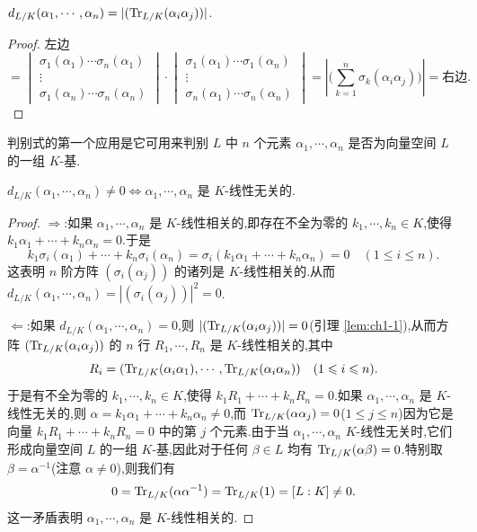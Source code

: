 \begin{lemma}\label{lem:ch1-1}
$d_{L/K}(\alpha_1,\cdots,\alpha_n)=|(\mathrm{Tr}_{L/K}(\alpha_i\alpha_j))|$.
\end{lemma}

\begin{proof}
左边
\[
  =\begin{vmatrix}
    \sigma_1(\alpha_1)\cdots\sigma_n(\alpha_1)\\
    \vdots\\
    \sigma_1(\alpha_n)\cdots\sigma_n(\alpha_n)
  \end{vmatrix}
  \cdot
  \begin{vmatrix}
    \sigma_1(\alpha_1)\cdots\sigma_1(\alpha_n)\\
    \vdots\\
    \sigma_n(\alpha_1)\cdots\sigma_n(\alpha_n)
  \end{vmatrix}
  =\left|\Big(\sum_{k=1}^{n}\sigma_k(\alpha_i\alpha_j)\Big)\right|
  =\text{右边}.
\]
\end{proof}

判别式的第一个应用是它可用来判别 $L$ 中 $n$ 个元素 $\alpha_1,\cdots,\alpha_n$ 是否为向量空间 $L$ 的一组 $K$-基.

\begin{lemma}\label{lem:ch1-2}
$d_{L/K}(\alpha_1,\cdots,\alpha_n)\neq 0\iff\alpha_1,\cdots,\alpha_n$ 是 $K$-线性无关的.
\end{lemma}

\begin{proof}
$\Rightarrow$:如果 $\alpha_1,\cdots,\alpha_n$ 是 $K$-线性相关的,即存在不全为零的 $k_1,\cdots,k_n\in K$,使得 $k_1\alpha_1+\cdots+k_n\alpha_n=0$.于是
\[
  k_1\sigma_i(\alpha_1)+\cdots+k_n\sigma_i(\alpha_n)=\sigma_i(k_1\alpha_1+\cdots+k_n\alpha_n)=0\quad (1\leqslant i\leqslant n).
\]
这表明 $n$ 阶方阵 $(\sigma_i(\alpha_j))$ 的诸列是 $K$-线性相关的.从而 $d_{L/K}(\alpha_1,\cdots,\alpha_n)=|(\sigma_i(\alpha_j))|^2=0$.

$\Leftarrow$:如果 $d_{L/K}(\alpha_1,\cdots,\alpha_n)=0$,则 $|(\mathrm{Tr}_{L/K}(\alpha_i\alpha_j))|=0$(引理 \ref{lem:ch1-1}),从而方阵 $(\mathrm{Tr}_{L/K}(\alpha_i\alpha_j))$ 的 $n$ 行 $R_1,\cdots,R_n$ 是 $K$-线性相关的,其中
\[
  R_i=(\mathrm{Tr}_{L/K}(\alpha_i\alpha_1),\cdots,\mathrm{Tr}_{L/K}(\alpha_i\alpha_n))\quad (1\leqslant i\leqslant n).
\]
于是有不全为零的 $k_1,\cdots,k_n\in K$,使得 $k_1R_1+\cdots+k_nR_n=0$.如果 $\alpha_1,\cdots,\alpha_n$ 是 $K$-线性无关的,则 $\alpha=k_1\alpha_1+\cdots+k_n\alpha_n\neq 0$,而 $\mathrm{Tr}_{L/K}(\alpha\alpha_j)=0$($1\leqslant j\leqslant n$)因为它是向量 $k_1R_1+\cdots+k_nR_n=0$ 中的第 $j$ 个元素.由于当 $\alpha_1,\cdots,\alpha_n$ $K$-线性无关时,它们形成向量空间 $L$ 的一组 $K$-基,因此对于任何 $\beta\in L$ 均有 $\mathrm{Tr}_{L/K}(\alpha\beta)=0$.特别取 $\beta=\alpha^{-1}$(注意 $\alpha\neq 0$),则我们有
\[
  0=\mathrm{Tr}_{L/K}(\alpha\alpha^{-1})=\mathrm{Tr}_{L/K}(1)=[L:K]\neq 0.
\]
这一矛盾表明 $\alpha_1,\cdots,\alpha_n$ 是 $K$-线性相关的.
\end{proof}

